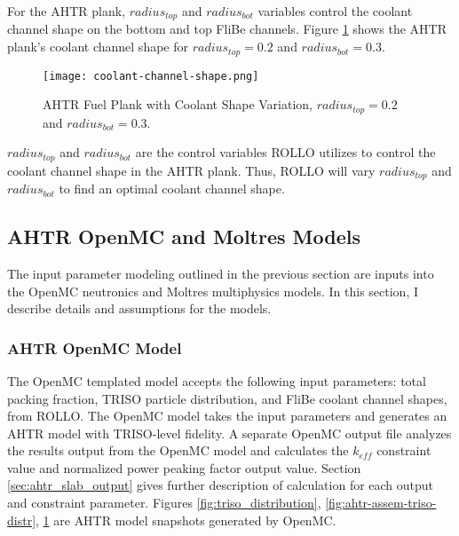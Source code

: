 For the \gls{AHTR} plank, $radius_{top}$ and $radius_{bot}$ variables control the coolant channel 
shape on the bottom and top FliBe channels. 
Figure \ref{fig:coolant-channel-shape} shows the \gls{AHTR} plank's coolant channel shape 
for $radius_{top} = 0.2$ and $radius_{bot} = 0.3$.
\begin{figure}[]
    \centering
        \texttt{[image: coolant-channel-shape.png]}
    \raggedright
    \caption{AHTR Fuel Plank with Coolant Shape Variation, $radius_{top} 
    = 0.2$ and $radius_{bot} = 0.3$.}  
    \label{fig:coolant-channel-shape}
\end{figure}
$radius_{top}$ and $radius_{bot}$ are the control variables \gls{ROLLO} 
utilizes to control the coolant channel shape in the \gls{AHTR} plank.
Thus, \gls{ROLLO} will vary $radius_{top}$ and $radius_{bot}$ to find an optimal coolant 
channel shape.


\subsection{AHTR OpenMC and Moltres Models}
\label{sec:ahtr-moltres-hom}
The input parameter modeling outlined in the previous section are inputs into 
the OpenMC neutronics and Moltres multiphysics models. 
In this section, I describe details and assumptions for the models. 

\subsubsection{AHTR OpenMC Model}
The OpenMC templated model accepts the following input parameters: total packing fraction, 
TRISO particle distribution, and FliBe coolant channel shapes, from \gls{ROLLO}.
The OpenMC model takes the input parameters and generates an \gls{AHTR} model with 
\gls{TRISO}-level fidelity. 
A separate OpenMC output file analyzes the results output from the OpenMC model and 
calculates the $k_{eff}$ constraint value and normalized power peaking factor output value.
Section \ref{sec:ahtr_slab_output} gives further description of calculation for 
each output and constraint parameter.
Figures \ref{fig:triso_distribution}, \ref{fig:ahtr-assem-triso-distr},
\ref{fig:coolant-channel-shape} are \gls{AHTR} model snapshots generated by OpenMC. 

